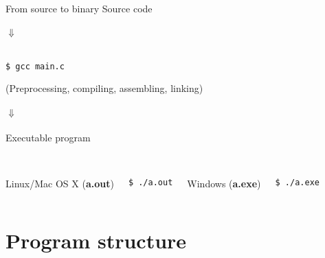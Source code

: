 \begin{frame}[fragile = singleslide]{From source to binary}
	\centering
	Source code\\\ \\
	$\Downarrow$\\\ \\
	\begin{lstlisting}[numbers=none]
$ gcc main.c
\end{lstlisting}
(Preprocessing, compiling, assembling, linking)
	\ \\\ \\
	$\Downarrow$\\\ \\
	Executable program\\\ \\
	\begin{columns}[T]
		Linux/Mac OS X (\textbf{a.out})
		\begin{lstlisting}[numbers=none]
$ ./a.out
\end{lstlisting}
		Windows (\textbf{a.exe})
		\begin{lstlisting}[numbers=none]
$ ./a.exe
\end{lstlisting}
	\end{columns}
\end{frame}
\section{Program structure}
\subsection{}

